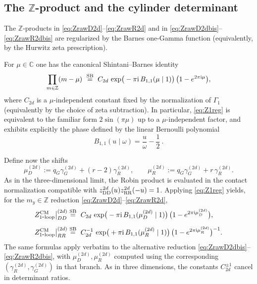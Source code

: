 \documentclass[11pt,a4paper]{article}
\numberwithin{equation}{section}
\theoremstyle{plain}
\theoremstyle{definition}
\theoremstyle{remark}
\newcommand{\ii}{\mathrm{i}}
\begin{document}
\subsection[The Z-product and the cylinder determinant]{The \texorpdfstring{$\mathbb{Z}$}{Z}-product and the cylinder determinant}

The $\mathbb{Z}$-products in \eqref{eq:ZrawD2d}--\eqref{eq:ZrawR2d} and in \eqref{eq:ZrawD2dbis}--\eqref{eq:ZrawR2dbis} are regularized by the Barnes one-Gamma function (equivalently, by the Hurwitz zeta prescription).

For $\mu\in\mathbb{C}$ one has the canonical Shintani--Barnes identity
\begin{equation}
\prod_{m\in\mathbb{Z}}(m-\mu)
\ \stackrel{\rm SB}{=}\
C_{2d}\,
\exp\!\big(-\pi \ii\,B_{1,1}(\mu\mid 1)\big)\,
\big(1-e^{2\pi \ii \mu}\big),
\label{eq:Z1reg}
\end{equation}
where $C_{2d}$ is a $\mu$-independent constant fixed by the normalization of $\Gamma_1$ (equivalently by the choice of zeta subtraction). In particular, \eqref{eq:Z1reg} is equivalent to the familiar form $2\sin(\pi\mu)$ up to a $\mu$-independent factor, and exhibits explicitly the phase defined by
the linear Bernoulli polynomial 
\begin{equation}
B_{1,1}(u\mid\omega)=\frac{u}{\omega}-\frac12~.
\label{eq:B11}
\end{equation}

Define now the shifts
\begin{equation}
\mu^{(2d)}_{D}:=q_G\gamma_G^{(2d)}+(r-2)\gamma_R^{(2d)},
\qquad
\mu^{(2d)}_{R}:=q_G\gamma_G^{(2d)}+r\,\gamma_R^{(2d)}.
\label{eq:mu2d}
\end{equation}
As in the three-dimensional limit, the Robin product is evaluated in the contact normalization compatible with \(z_{\rm DD}^{2d}(u)z_{\rm RR}^{2d}(-u)=1\).  Applying \eqref{eq:Z1reg} yields, for the $m_y\in\mathbb{Z}$ reduction \eqref{eq:ZrawD2d}--\eqref{eq:ZrawR2d},
\begin{align}
Z^{\mathrm{CM}}_{\mathrm{1\mbox{-}loop}}\big|_{DD}^{(2d)}
&\stackrel{\rm SB}{=}\
C_{2d}\,
\exp\!\big(-\pi \ii\,B_{1,1}(\mu^{(2d)}_{D}\mid 1)\big)\,
\big(1-e^{2\pi \ii \mu^{(2d)}_{D}}\big),
\label{eq:Z2dDDreg}\\[2mm]
Z^{\mathrm{CM}}_{\mathrm{1\mbox{-}loop}}\big|_{RR}^{(2d)}
&\stackrel{\rm SB}{=}\
C_{2d}^{-1}\,
\exp\!\big(+\pi \ii\,B_{1,1}(\mu^{(2d)}_{R}\mid 1)\big)\,
\big(1-e^{2\pi \ii \mu^{(2d)}_{R}}\big)^{-1}.
\label{eq:Z2dRRreg}
\end{align}
The same formulas apply verbatim to the alternative reduction \eqref{eq:ZrawD2dbis}--\eqref{eq:ZrawR2dbis}, with $\mu^{(2d)}_{D},\mu^{(2d)}_{R}$ computed using the corresponding $(\gamma_R^{(2d)},\gamma_G^{(2d)})$ in that branch. As in three dimensions, the constants $C_{2d}^{\pm 1}$ cancel in determinant ratios.
\end{document}
